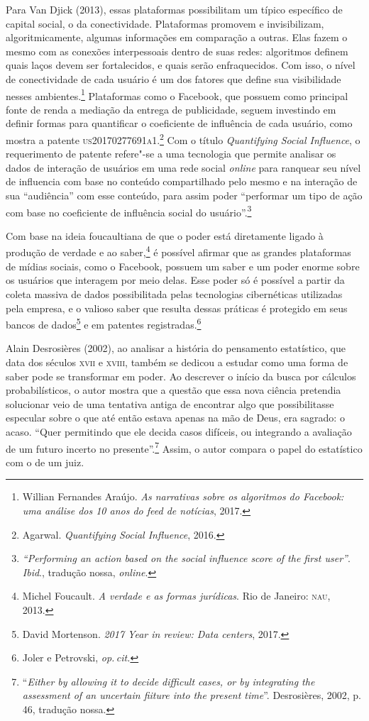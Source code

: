 Para Van Djick (2013), essas plataformas possibilitam um típico
específico de capital social, o da conectividade. Plataformas promovem e
invisibilizam, algoritmicamente, algumas informações em comparação a
outras. Elas fazem o mesmo com as conexões interpessoais dentro de suas
redes: algoritmos definem quais laços devem ser fortalecidos, e quais
serão enfraquecidos. Com isso, o nível de conectividade de cada usuário
é um dos fatores que define sua visibilidade nesses ambientes.\footnote{Willian Fernandes Araújo. \emph{As narrativas sobre os algoritmos do Facebook: uma
análise dos 10 anos do feed de notícias}, 2017.} %
Plataformas como o Facebook, que possuem como
principal fonte de renda a mediação da entrega de publicidade, seguem
investindo em definir formas para quantificar o coeficiente de
influência de cada usuário, como mostra a patente \textsc{us20170277691a1}.\footnote{Agarwal. \emph{Quantifying Social Influence}, 2016.}
Com o título \emph{Quantifying Social Influence}, o
requerimento de patente refere"-se a uma tecnologia que permite analisar
os dados de interação de usuários em uma rede social \emph{online} para
ranquear seu nível de influencia com base no conteúdo compartilhado pelo
mesmo e na interação de sua ``audiência'' com esse conteúdo, para assim
poder ``performar um tipo de ação com base no coeficiente de influência
social do usuário''.\footnote{\emph{``Performing an action based on the social influence score of the first user''}. \textit{Ibid}., tradução nossa, \emph{online}.}

Com base na ideia foucaultiana de que o poder está diretamente ligado à
produção de verdade e ao saber,\footnote{Michel Foucault. \emph{A verdade e as formas jurídicas}. Rio de Janeiro: \textsc{nau}, 2013.}
é possível afirmar que as grandes plataformas de mídias sociais, como o
Facebook, possuem um saber e um poder enorme sobre os usuários que
interagem por meio delas. Esse poder só é possível a partir da coleta
massiva de dados possibilitada pelas tecnologias cibernéticas utilizadas
pela empresa, e o valioso saber que resulta dessas práticas é protegido
em seus bancos de dados\footnote{David Mortenson. \emph{2017 Year in review: Data centers}, 2017.} e em patentes registradas.\footnote{Joler e Petrovski, \textit{op.\,cit.}}

Alain Desrosières (2002), ao analisar a história do pensamento estatístico, que data dos séculos
\textsc{xvii} e \textsc{xviii}, também se dedicou a estudar como uma forma de saber pode
se transformar em poder. Ao descrever o início da busca por cálculos
probabilísticos, o autor mostra que a questão que essa nova ciência
pretendia solucionar veio de uma tentativa antiga de encontrar algo que
possibilitasse especular sobre o que até então estava apenas na mão de
Deus, era sagrado: o acaso. ``Quer permitindo que ele decida casos
difíceis, ou integrando a avaliação de um futuro incerto no
presente''.\footnote{``\emph{Either by allowing it to decide difficult cases,
  or by integrating the assessment of an uncertain fiiture into the
  present time}''. Desrosières, 2002, p.\,46, tradução nossa.} Assim, o autor compara o papel
do estatístico com o de um juiz.

